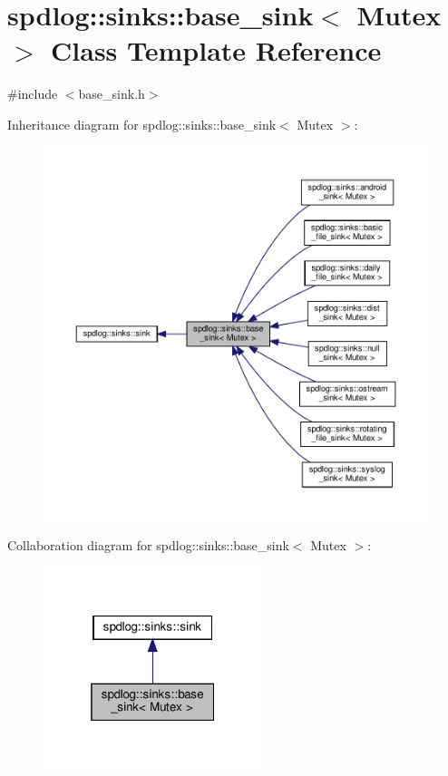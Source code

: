 \hypertarget{classspdlog_1_1sinks_1_1base__sink}{}\section{spdlog\+:\+:sinks\+:\+:base\+\_\+sink$<$ Mutex $>$ Class Template Reference}
\label{classspdlog_1_1sinks_1_1base__sink}


{\ttfamily \#include $<$base\+\_\+sink.\+h$>$}



Inheritance diagram for spdlog\+:\+:sinks\+:\+:base\+\_\+sink$<$ Mutex $>$\+:
\nopagebreak
\begin{figure}[H]
\begin{center}
\leavevmode
\includegraphics[width=350pt]{classspdlog_1_1sinks_1_1base__sink__inherit__graph}
\end{center}
\end{figure}


Collaboration diagram for spdlog\+:\+:sinks\+:\+:base\+\_\+sink$<$ Mutex $>$\+:
\nopagebreak
\begin{figure}[H]
\begin{center}
\leavevmode
\includegraphics[width=181pt]{classspdlog_1_1sinks_1_1base__sink__coll__graph}
\end{center}
\end{figure}

